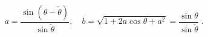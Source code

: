 \begin{equation}
a = \frac{\sin(\theta-{\widetilde{\theta}})}
         {\sin{\widetilde{\theta}}}, \quad
b = \sqrt{1+2a\cos\theta+a^2} 
= \frac{\sin\theta}{\sin{\widetilde{\theta}}} \; .
\end{equation}

